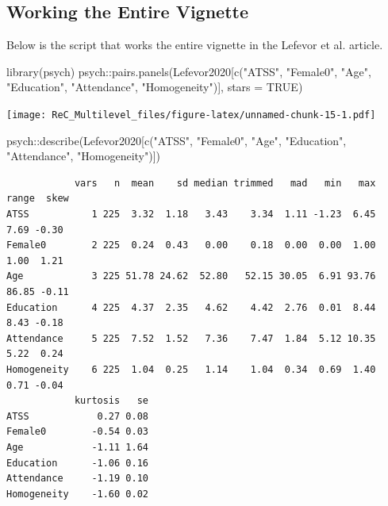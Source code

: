\documentclass[
  english,
]{book}
\newenvironment{Shaded}{\begin{snugshade}}{\end{snugshade}}
\newcommand{\AttributeTok}[1]{\textcolor[rgb]{0.77,0.63,0.00}{#1}}
\newcommand{\ConstantTok}[1]{\textcolor[rgb]{0.00,0.00,0.00}{#1}}
\newcommand{\FunctionTok}[1]{\textcolor[rgb]{0.00,0.00,0.00}{#1}}
\newcommand{\NormalTok}[1]{#1}
\newcommand{\SpecialCharTok}[1]{\textcolor[rgb]{0.00,0.00,0.00}{#1}}
\newcommand{\StringTok}[1]{\textcolor[rgb]{0.31,0.60,0.02}{#1}}
\begin{document}
\hypertarget{working-the-entire-vignette}{%
\subsection{Working the Entire Vignette}\label{working-the-entire-vignette}}

Below is the script that works the entire vignette in the Lefevor et al. \citeyearpar{lefevor_homonegativity_2020} article.

\begin{Shaded}
\begin{Highlighting}[]
\FunctionTok{library}\NormalTok{(psych)}
\NormalTok{psych}\SpecialCharTok{::}\FunctionTok{pairs.panels}\NormalTok{(Lefevor2020[}\FunctionTok{c}\NormalTok{(}\StringTok{"ATSS"}\NormalTok{, }\StringTok{"Female0"}\NormalTok{, }\StringTok{"Age"}\NormalTok{, }\StringTok{"Education"}\NormalTok{, }\StringTok{"Attendance"}\NormalTok{, }\StringTok{"Homogeneity"}\NormalTok{)], }\AttributeTok{stars =} \ConstantTok{TRUE}\NormalTok{)}
\end{Highlighting}
\end{Shaded}

\texttt{[image: ReC\_Multilevel\_files/figure-latex/unnamed-chunk-15-1.pdf]}

\begin{Shaded}
\begin{Highlighting}[]
\NormalTok{psych}\SpecialCharTok{::}\FunctionTok{describe}\NormalTok{(Lefevor2020[}\FunctionTok{c}\NormalTok{(}\StringTok{"ATSS"}\NormalTok{, }\StringTok{"Female0"}\NormalTok{, }\StringTok{"Age"}\NormalTok{, }\StringTok{"Education"}\NormalTok{, }\StringTok{"Attendance"}\NormalTok{, }\StringTok{"Homogeneity"}\NormalTok{)])}
\end{Highlighting}
\end{Shaded}

\begin{verbatim}
            vars   n  mean    sd median trimmed   mad   min   max range  skew
ATSS           1 225  3.32  1.18   3.43    3.34  1.11 -1.23  6.45  7.69 -0.30
Female0        2 225  0.24  0.43   0.00    0.18  0.00  0.00  1.00  1.00  1.21
Age            3 225 51.78 24.62  52.80   52.15 30.05  6.91 93.76 86.85 -0.11
Education      4 225  4.37  2.35   4.62    4.42  2.76  0.01  8.44  8.43 -0.18
Attendance     5 225  7.52  1.52   7.36    7.47  1.84  5.12 10.35  5.22  0.24
Homogeneity    6 225  1.04  0.25   1.14    1.04  0.34  0.69  1.40  0.71 -0.04
            kurtosis   se
ATSS            0.27 0.08
Female0        -0.54 0.03
Age            -1.11 1.64
Education      -1.06 0.16
Attendance     -1.19 0.10
Homogeneity    -1.60 0.02
\end{verbatim}
\end{document}
